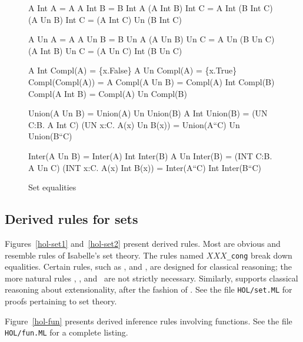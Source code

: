 \begin{figure} \underscoreon
\begin{ttbox}
         A Int A = A
        A Int B = B Int A
          (A Int B) Int C  =  A Int (B Int C)
     (A Un B)  Int C  =  (A Int C) Un (B Int C)

          A Un A = A
         A Un B = B Un A
           (A Un B)  Un C  =  A Un (B Un C)
     (A Int B) Un C  =  (A Un C) Int (B Un C)

     A Int Compl(A) = \{x.False\} 
    A Un  Compl(A) = \{x.True\}
  Compl(Compl(A)) = A
           Compl(A Un B)  = Compl(A) Int Compl(B)
          Compl(A Int B) = Compl(A) Un Compl(B)

   Union(A Un B) = Union(A) Un Union(B)
          A Int Union(B) = (UN C:B. A Int C)
    (UN x:C. A(x) Un B(x)) = Union(A``C)  Un  Union(B``C)

   Inter(A Un B) = Inter(A) Int Inter(B)
           A Un Inter(B) = (INT C:B. A Un C)
   (INT x:C. A(x) Int B(x)) = Inter(A``C) Int Inter(B``C)
\end{ttbox}
\caption{Set equalities} \label{hol-equalities}
\end{figure}


\subsection{Derived rules for sets}
Figures~\ref{hol-set1} and~\ref{hol-set2} present derived rules.  Most
are obvious and resemble rules of Isabelle's {\ZF} set theory.  The
rules named $XXX${\tt_cong} break down equalities.  Certain rules, such as
,  and , are
designed for classical reasoning; the more natural rules ,
,  and~ are not
strictly necessary.  Similarly,  supports classical
reasoning about extensionality, after the fashion of .  See
the file {\tt HOL/set.ML} for proofs pertaining to set theory.

Figure~\ref{hol-fun} presents derived inference rules involving functions.  See
the file {\tt HOL/fun.ML} for a complete listing.

